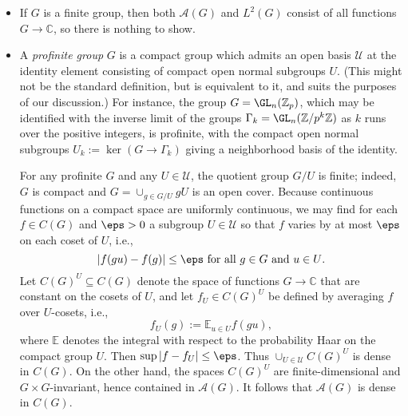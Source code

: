 \documentclass[reqno]{amsart} 
\begin{document}
\begin{itemize}
\item If $G$ is a finite group, then both $\mathcal{A}(G)$ and $L^2(G)$ consist of all functions $G \rightarrow \mathbb{C}$, so there is nothing to show.
\item A \emph{profinite group} $G$ is a compact group which admits an open basis $\mathcal{U}$ at the identity element consisting of compact open normal subgroups $U$.  (This might not be the standard definition, but is equivalent to it, and suits the purposes of our discussion.)  For instance, the group $G = \GL_n(\mathbb{Z}_p)$, which may be identified with the inverse limit of the groups $\Gamma_k = \GL_n(\mathbb{Z}/p^k \mathbb{Z})$ as $k$ runs over the positive integers, is profinite, with the compact open normal subgroups $U_k := \ker(G \rightarrow \Gamma_k)$ giving a neighborhood basis of the identity.

  For any profinite $G$ and any $U \in \mathcal{U}$, the quotient group $G/U$ is finite; indeed, $G$ is compact and $G = \cup_{g \in G/U} g U$ is an open cover.  Because continuous functions on a compact space are uniformly continuous, we may find for each $f \in C(G)$ and $\eps > 0$ a subgroup $U \in \mathcal{U}$ so that $f$ varies by at most $\eps$ on each coset of $U$, i.e.,
  \begin{equation*}
|f(g u) - f(g)| \leq \eps\text{ for all $g \in G$ and $u \in U$}.
\end{equation*}
 Let $C(G)^U \subseteq C(G)$ denote the space of functions $G \rightarrow \mathbb{C}$ that are constant on the cosets of $U$, and let $f_U \in C(G)^U$ be defined by averaging $f$ over $U$-cosets, i.e.,
  \begin{equation*}
    f_U(g) := \mathbb{E}_{u \in U} f(g u),
  \end{equation*}
  where $\mathbb{E}$ denotes the integral with respect to the probability Haar on the compact group $U$.  Then $\sup |f - f_U| \leq \eps$.  Thus $\cup_{U \in \mathcal{U} } C(G)^U$ is dense in $C(G)$.  On the other hand, the spaces $C(G)^U$ are finite-dimensional and $G \times G$-invariant, hence contained in $\mathcal{A}(G)$.  It follows that $\mathcal{A}(G)$ is dense in $C(G)$.
\end{itemize}
\end{document}
